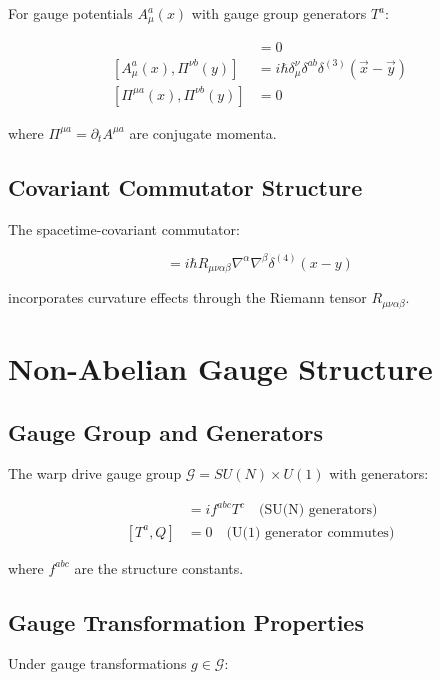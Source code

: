 \documentclass[12pt,a4paper]{article}
\begin{document}
For gauge potentials $A_\mu^a(x)$ with gauge group generators $T^a$:

\begin{align}
[A_\mu^a(x), A_\nu^b(y)] &= 0 \\
[A_\mu^a(x), \Pi^{\nu b}(y)] &= i\hbar \delta_\mu^\nu \delta^{ab} \delta^{(3)}(\vec{x} - \vec{y}) \\
[\Pi^{\mu a}(x), \Pi^{\nu b}(y)] &= 0
\end{align}

where $\Pi^{\mu a} = \partial_t A^{\mu a}$ are conjugate momenta.

\subsection{Covariant Commutator Structure}

The spacetime-covariant commutator:

\begin{equation}
[\nabla_\mu \hat{\phi}(x), \nabla_\nu \hat{\phi}(y)] = i\hbar R_{\mu\nu\alpha\beta} \nabla^\alpha \nabla^\beta \delta^{(4)}(x-y)
\end{equation}

incorporates curvature effects through the Riemann tensor $R_{\mu\nu\alpha\beta}$.

\section{Non-Abelian Gauge Structure}

\subsection{Gauge Group and Generators}

The warp drive gauge group $\mathcal{G} = SU(N) \times U(1)$ with generators:

\begin{align}
[T^a, T^b] &= if^{abc} T^c \quad \text{(SU(N) generators)} \\
[T^a, Q] &= 0 \quad \text{(U(1) generator commutes)}
\end{align}

where $f^{abc}$ are the structure constants.

\subsection{Gauge Transformation Properties}

Under gauge transformations $g \in \mathcal{G}$:
\end{document}
